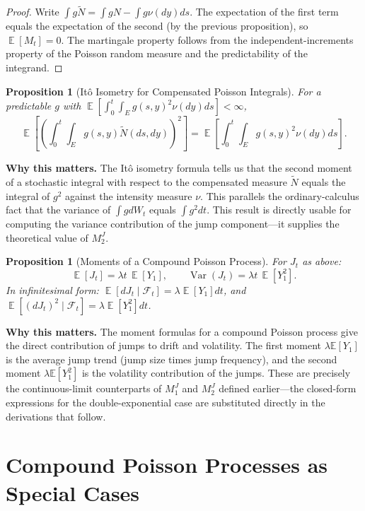 \documentclass[11pt,a4paper,openany]{book}
\theoremstyle{definition}
\theoremstyle{plain}
\newtheorem{proposition}[theorem]{Proposition}
\theoremstyle{remark}
\DeclareMathOperator{\E}{\mathbb{E}}
\DeclareMathOperator{\Var}{Var}
\newcommand{\1}{\mathbbm{1}}
\newcommand{\F}{\mathcal{F}}
\begin{document}
\begin{proof}
Write $\int g \widetilde{N} = \int g N - \int g \nu(dy) ds$. The expectation of the first term equals the expectation of the second (by the previous proposition), so $\E[M_{t}] = 0$. The martingale property follows from the independent-increments property of the Poisson random measure and the predictability of the integrand.
\end{proof}

\begin{proposition}[It\^{o} Isometry for Compensated Poisson Integrals]
For a predictable $g$ with $\E[\int_{0}^{t} \int_{E} g(s,y)^{2} \nu(dy) ds] < \infty$,
\[
\E\left[\left(\int_{0}^{t} \int_{E} g(s,y) \widetilde{N}(ds, dy)\right)^{2}\right] = \E\left[\int_{0}^{t} \int_{E} g(s,y)^{2} \nu(dy) ds\right].
\]
\end{proposition}

\medskip
\noindent\textbf{Why this matters.} The It\^{o} isometry formula tells us that the second moment of a stochastic integral with respect to the compensated measure $\widetilde{N}$ equals the integral of $g^2$ against the intensity measure $\nu$. This parallels the ordinary-calculus fact that the variance of $\int g dW_t$ equals $\int g^2 dt$. This result is directly usable for computing the variance contribution of the jump component---it supplies the theoretical value of $M_2^J$.

\begin{proposition}[Moments of a Compound Poisson Process]
For $J_{t}$ as above:
\[
\E[J_{t}] = \lambda t \, \E[Y_{1}], \qquad \Var(J_{t}) = \lambda t \, \E[Y_{1}^{2}].
\]
In infinitesimal form: $\E[dJ_{t} \mid \F_{t}] = \lambda \E[Y_{1}] dt$, and $\E[(dJ_{t})^{2} \mid \F_{t}] = \lambda \E[Y_{1}^{2}] dt$.
\end{proposition}

\medskip
\noindent\textbf{Why this matters.} The moment formulas for a compound Poisson process give the direct contribution of jumps to drift and volatility. The first moment $\lambda \mathbb{E}[Y_1]$ is the average jump trend (jump size times jump frequency), and the second moment $\lambda \mathbb{E}[Y_1^2]$ is the volatility contribution of the jumps. These are precisely the continuous-limit counterparts of $M_1^J$ and $M_2^J$ defined earlier---the closed-form expressions for the double-exponential case are substituted directly in the derivations that follow.

\section{Compound Poisson Processes as Special Cases}
\end{document}
